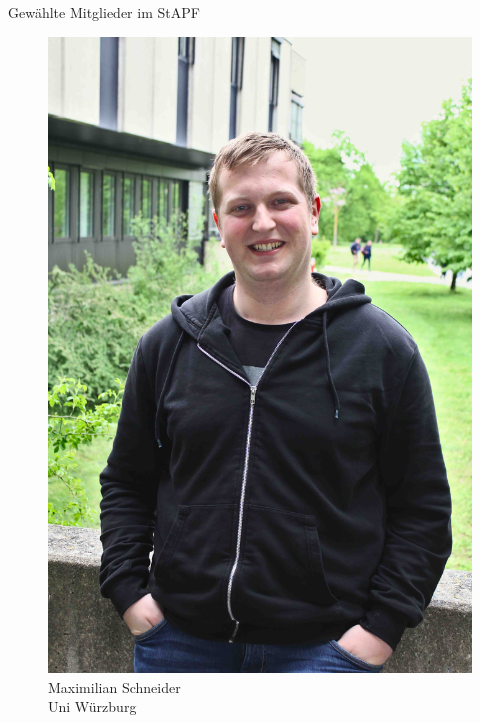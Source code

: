 \documentclass[compress, aspectratio=169]{beamer}
\begin{document}
\begin{frame}{Gewählte Mitglieder im StAPF}
\begin{minipage}{.28\textwidth}
\begin{figure}
\begin{minipage}[c]{.47\textwidth}
        \includegraphics[height=0.35\textheight]{max.jpg}
      \end{minipage} \hfill
      \begin{minipage}[c]{.5\textwidth}
        \caption*{Maximilian Schneider \\Uni Würzburg}
      \end{minipage}
    \end{figure}
  \end{minipage}
  \hspace{0.1\textwidth}

\end{frame}

\end{document}
